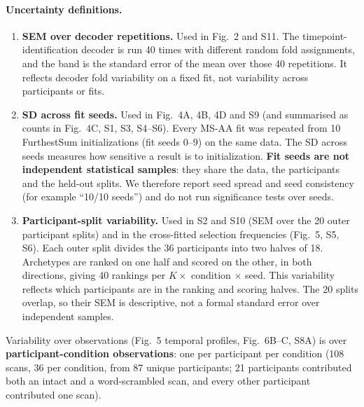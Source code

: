 \paragraph{Uncertainty definitions.}
\begin{enumerate}
  \item \textbf{SEM over decoder repetitions.} Used in Fig.~2 and S11. The timepoint-identification decoder is run 40 times with different random fold assignments, and the band is the standard error of the mean over those 40 repetitions. It reflects decoder fold variability on a fixed fit, not variability across participants or fits.
  \item \textbf{SD across fit seeds.} Used in Fig.~4A, 4B, 4D and S9 (and summarised as counts in Fig.~4C, S1, S3, S4--S6). Every MS-AA fit was repeated from 10 FurthestSum initializations (fit seeds 0--9) on the same data. The SD across seeds measures how sensitive a result is to initialization. \textbf{Fit seeds are not independent statistical samples}: they share the data, the participants and the held-out splits. We therefore report seed spread and seed
    consistency (for example ``10/10 seeds'') and do not run significance tests over seeds.
  \item \textbf{Participant-split variability.} Used in S2 and S10 (SEM over the 20 outer participant splits) and in the cross-fitted selection frequencies (Fig.~5, S5, S6). Each outer split divides the 36 participants into two halves of 18. Archetypes are ranked on one half and scored on the other, in both directions, giving 40 rankings per $K \times$ condition $\times$ seed. This variability reflects which participants are in the ranking and scoring halves. The 20 splits overlap, so their SEM is descriptive, not a formal standard error over independent samples.
\end{enumerate}
Variability over observations (Fig.~5 temporal profiles, Fig.~6B--C, S8A) is over \textbf{participant-condition observations}: one per participant per condition (108 scans, 36 per condition, from 87 unique participants; 21 participants contributed both an intact and a word-scrambled scan, and every other participant contributed one scan).

